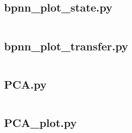 \documentclass{mcmthesis}
\begin{document}
\begin{appendices}
\subsection{bpnn\_plot\_state.py} \label{code:bpnn_plot_state}
\inputminted{python}{../src/bpnn_plot_state.py}

\subsection{bpnn\_plot\_transfer.py} \label{code:bpnn_plot_transfer}
\inputminted{python}{../src/bpnn_plot_transfer.py}

\subsection{PCA.py} \label{code:PCA}
\inputminted{python}{../src/PCA.py}

\subsection{PCA\_plot.py} \label{code:PCA_plot}
\inputminted{python}{../src/PCA_plot.py}



\end{appendices}
\end{document}
